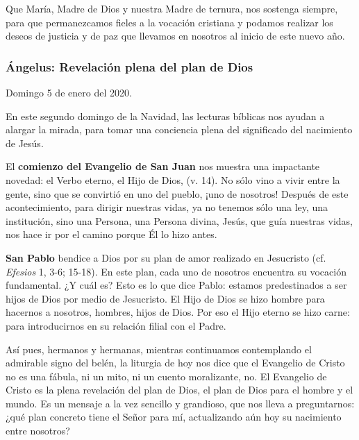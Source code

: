 \begin{body}
\begin{body}
Que María, Madre de Dios y nuestra Madre de ternura, nos sostenga siempre, para que permanezcamos fieles a la vocación cristiana y podamos realizar los deseos de justicia y de paz que llevamos en nosotros al inicio de este nuevo año.

\subsubsection{Ángelus: Revelación plena del plan de Dios}

Domingo 5 de enero del 2020.

En este segundo domingo de la Navidad, las lecturas bíblicas nos ayudan a alargar la mirada, para tomar una conciencia plena del significado del nacimiento de Jesús.

El \textbf{comienzo del Evangelio de San Juan} nos muestra una impactante novedad: el Verbo eterno, el Hijo de Dios,  (v. 14). No sólo vino a vivir entre la gente, sino que se convirtió en uno del pueblo, ¡uno de nosotros! Después de este acontecimiento, para dirigir nuestras vidas, ya no tenemos sólo una ley, una institución, sino una Persona, una Persona divina, Jesús, que guía nuestras vidas, nos hace ir por el camino porque Él lo hizo antes.

\textbf{San Pablo} bendice a Dios por su plan de amor realizado en Jesucristo (cf. \emph{Efesios} 1, 3-6; 15-18). En este plan, cada uno de nosotros encuentra su vocación fundamental. ¿Y cuál es? Esto es lo que dice Pablo: estamos predestinados a ser hijos de Dios por medio de Jesucristo. El Hijo de Dios se hizo hombre para hacernos a nosotros, hombres, hijos de Dios. Por eso el Hijo eterno se hizo carne: para introducirnos en su relación filial con el Padre.

Así pues, hermanos y hermanas, mientras continuamos contemplando el admirable signo del belén, la liturgia de hoy nos dice que el Evangelio de Cristo no es una fábula, ni un mito, ni un cuento moralizante, no. El Evangelio de Cristo es la plena revelación del plan de Dios, el plan de Dios para el hombre y el mundo. Es un mensaje a la vez sencillo y grandioso, que nos lleva a preguntarnos: ¿qué plan concreto tiene el Señor para mí, actualizando aún hoy su nacimiento entre nosotros?


\end{body}
\end{body}
